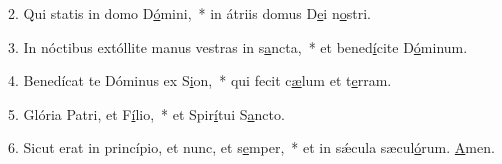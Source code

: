 2. Qui statis in domo D\uline{ó}mini,~* in átriis domus D\uline{e}i n\uline{o}stri.\par 
3. In nóctibus extóllite manus vestras in s\uline{a}ncta,~* et bened\uline{í}cite D\uline{ó}minum.\par 
4. Benedícat te Dóminus ex S\uline{i}on,~* qui fecit c\uline{æ}lum et t\uline{e}rram.\par 
5. Glória Patri, et F\uline{í}lio,~* et Spir\uline{í}tui S\uline{a}ncto.\par 
6. Sicut erat in princípio, et nunc, et s\uline{e}mper,~* et in sǽcula sæcul\uline{ó}rum. \uline{A}men.\par 
